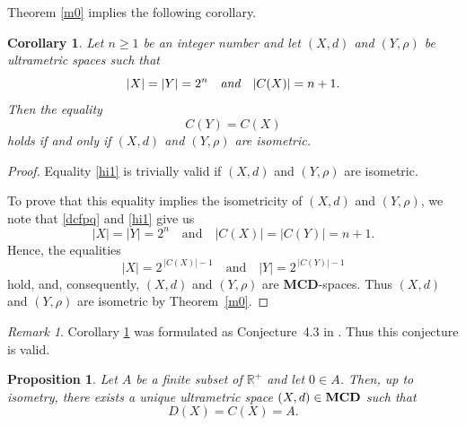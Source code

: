 \documentclass{raex}
\newtheorem{cor}[thm]{Corollary}
\newtheorem{prop}[thm]{Proposition}
\theoremstyle{definition}
\theoremstyle{remark}
\newtheorem{rem}[thm]{Remark}
\numberwithin{equation}{section}
\begin{document}
 Theorem \ref{m0} implies the following corollary.
 
 

\begin{cor} \label{UT2Cor7}
Let $n\geq 1$ be an integer number and let $(X,d)$ and $(Y,\rho)$ be ultrametric spaces such that
\begin{equation}\label{dcfpq}
|X| = |Y| = 2^n \quad \text{\it and} \quad  |C(X)| = n+1.
\end{equation}
Then the equality
    \begin{equation}
        \label{hi1}
    C(Y) = C(X)
        \end{equation}
holds if and only if $(X,d)$ and $(Y,\rho)$ are isometric.
\end{cor}

\begin{proof}
Equality \eqref{hi1} is trivially valid if $(X,d)$ and $(Y,\rho)$ are isometric.

To prove that this equality implies the isometricity of $(X,d)$ and $(Y,\rho)$, we note that \eqref{dcfpq}  and \eqref{hi1} give us 
\begin{equation*}
    |X|=|Y|=2^n \quad \text{and} \quad |C(X)|=|C(Y)|=n+1.
\end{equation*}
Hence, the equalities
\[
|X|=2^{\,|C(X)|-1} \quad \text{and} \quad |Y|=2^{\,|C(Y)|-1}
\]
hold, and, consequently, $(X,d)$ and $(Y,\rho)$ are {\bf MCD}-spaces.
Thus $(X,d)$ and $(Y,\rho)$ are isometric by Theorem~\ref{m0}.
\end{proof}

\begin{rem}
Corollary \ref{UT2Cor7} was formulated as  Conjecture~4.3 in \cite{DovgosheyRovenska2026}. Thus this conjecture is valid.
\end{rem}



\begin{prop}
     \label{UT2Cor8}
Let $A$ be a finite subset of $\mathbb{R}^+$ and let $0 \in A$. Then, up to isometry, there exists a unique ultrametric space $(X,d)\in {\bf MCD}$ such that
\begin{equation}\label{dse}
    D(X) = C(X) = A.
\end{equation}
\end{prop}
\end{document}
